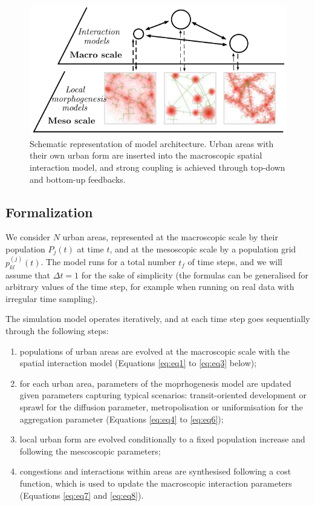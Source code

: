 \documentclass[ijgi,article,submit,moreauthors,pdftex]{Definitions/mdpi}
\begin{document}
\begin{figure}[H]
 \includegraphics[width=\linewidth]{figures/multiscale_morph.pdf}
 \caption{Schematic representation of model architecture. Urban areas with their own urban form are inserted into the macroscopic spatial interaction model, and strong coupling is achieved through top-down and bottom-up feedbacks.\label{fig:fig1}}
\end{figure}

\subsection{Formalization}


We consider $N$ urban areas, represented at the macroscopic scale by their population $P_j(t)$ at time $t$, and at the mesoscopic scale by a population grid $p_{kl}^{(j)}(t)$. The model runs for a total number $t_f$ of time steps, and we will assume that $\Delta t = 1$ for the sake of simplicity (the formulas can be generalised for arbitrary values of the time step, for example when running on real data with irregular time sampling).

The simulation model operates iteratively, and at each time step goes sequentially through the following steps:
\begin{enumerate}
	\item populations of urban areas are evolved at the macroscopic scale with the spatial interaction model (Equations \ref{eq:eq1} to \ref{eq:eq3} below);
	\item for each urban area, parameters of the moprhogenesis model are updated given parameters capturing typical scenarios: transit-oriented development or sprawl for the diffusion parameter, metropolisation or uniformisation for the aggregation parameter (Equations \ref{eq:eq4} to \ref{eq:eq6});
	\item local urban form are evolved conditionally to a fixed population increase and following the mescoscopic parameters;
	\item congestions and interactions within areas are synthesised following a cost function, which is used to update the macroscopic interaction parameters (Equations \ref{eq:eq7} and \ref{eq:eq8}).
\end{enumerate}
\end{document}
